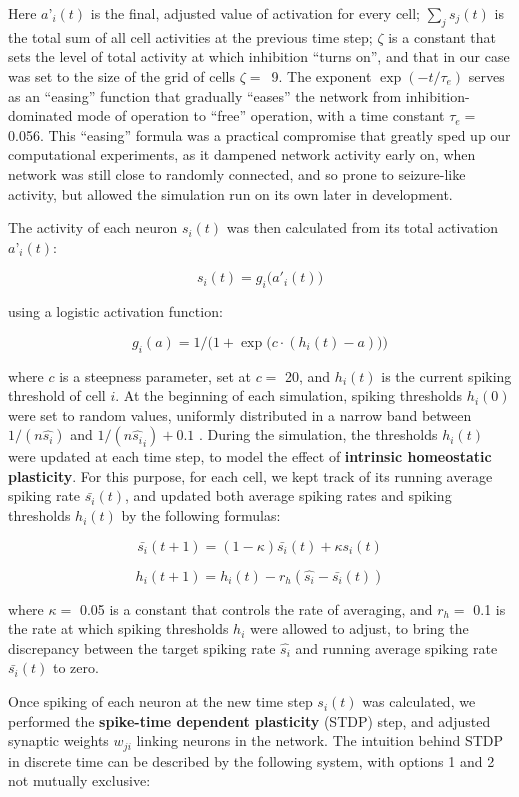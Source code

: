 \documentclass{article}
\begin{document}
Here $a’_i(t)$ is the final, adjusted value of activation for every cell; $\sum_j{s_j(t)}$ is the total sum of all cell activities at the previous time step; $\zeta$ is a constant that sets the level of total activity at which inhibition “turns on”, and that in our case was set to the size of the grid of cells \mbox{$\zeta=$ 9}. The exponent $\exp(-t/\tau_e)$ serves as an “easing” function that gradually “eases” the network from inhibition-dominated mode of operation to “free” operation, with a time constant $\tau_e=$ 0.056. This “easing” formula was a practical compromise that greatly sped up our computational experiments, as it dampened network activity early on, when network was still close to randomly connected, and so prone to seizure-like activity, but allowed the simulation run on its own later in development.

The activity of each neuron $s_i(t)$ was then calculated from its total activation $a’_i(t)$:

$$s_i(t) = g_i\big(a'_i(t)\big)$$

using a logistic activation function: 

$$g_i(a) = 1/\Big(1+\exp\big(c\cdot(h_i(t)-a)\big)\Big)$$

where $c$ is a steepness parameter, set at $c=$ 20, and $h_i(t)$ is the current spiking threshold of cell $i$. At the beginning of each simulation, spiking thresholds $h_i(0)$ were set to random values, uniformly distributed in a narrow band between $1/(n \hat{s_i})$ and $1/(n \hat{s_i}_i)+0.1$ . During the simulation, the thresholds $h_i(t)$ were updated at each time step, to model the effect of \textbf{intrinsic homeostatic plasticity}. For this purpose, for each cell, we kept track of its running average spiking rate $\bar{s_i}(t)$, and updated both average spiking rates and spiking thresholds $h_i(t)$ by the following formulas:

$$\bar{s_i}(t+1) = (1-\kappa)\bar{s_i}(t) + \kappa s_i(t)$$

$$h_i(t+1) = h_i(t) - r_h(\hat{s_i} - \bar{s_i}(t))$$

where $\kappa=$ 0.05 is a constant that controls the rate of averaging, and $r_h=$ 0.1 is the rate at which spiking thresholds $h_i$ were allowed to adjust, to bring the discrepancy between the target spiking rate $\hat{s_i}$ and running average spiking rate $\bar{s_i}(t)$ to zero.

Once spiking of each neuron at the new time step $s_i(t)$ was calculated, we performed the \textbf{spike-time dependent plasticity} (STDP) step, and adjusted synaptic weights $w_{ji}$ linking neurons in the network. The intuition behind STDP in discrete time can be described by the following system, with options 1 and 2 not mutually exclusive:
\end{document}
